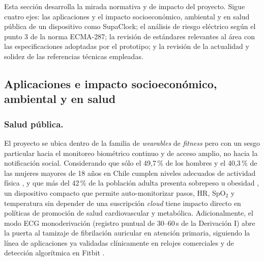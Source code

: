 \documentclass[letterpaper,11pt]{article}
\begin{document}
Esta secci\'on desarrolla la mirada normativa y de impacto del proyecto. Sigue cuatro ejes: las aplicaciones y el impacto socioecon\'omico, ambiental y en salud p\'ublica de un dispositivo como SupaClock; el an\'alisis de riesgo el\'ectrico seg\'un el punto 3 de la norma ECMA-287; la revisi\'on de est\'andares relevantes al \'area con las especificaciones adoptadas por el prototipo; y la revisi\'on de la actualidad y solidez de las referencias t\'ecnicas empleadas.

\subsection{Aplicaciones e impacto socioecon\'omico, ambiental y en salud}

\subsubsection*{Salud p\'ublica.} El proyecto se ubica dentro de la familia de \textit{wearables} de \textit{fitness} pero con un sesgo particular hacia el monitoreo biom\'etrico continuo y de acceso amplio, no hacia la notificaci\'on social. Considerando que s\'olo el 49{,}7\,\% de los hombres y el 40{,}3\,\% de las mujeres mayores de 18 a\~nos en Chile cumplen niveles adecuados de actividad f\'isica \cite{encuesta_af,minsalwearables}, y que m\'as del 42\,\% de la poblaci\'on adulta presenta sobrepeso u obesidad \cite{obesidad_chile}, un dispositivo compacto que permite auto-monitorizar pasos, HR, SpO$_2$ y temperatura sin depender de una suscripci\'on \textit{cloud} tiene impacto directo en pol\'iticas de promoci\'on de salud cardiovascular y metab\'olica. Adicionalmente, el modo ECG monoderivaci\'on (registro puntual de $30$--$60$\,s de la Derivaci\'on I) abre la puerta al tamizaje de fibrilaci\'on auricular en atenci\'on primaria, siguiendo la l\'inea de aplicaciones ya validadas cl\'inicamente en relojes comerciales \cite{Shin2019} y de detecci\'on algor\'itmica en Fitbit \cite{fitbit_afib}.
\end{document}
